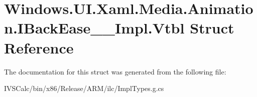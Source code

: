 \hypertarget{struct_windows_1_1_u_i_1_1_xaml_1_1_media_1_1_animation_1_1_i_back_ease_____impl_1_1_vtbl}{}\section{Windows.\+U\+I.\+Xaml.\+Media.\+Animation.\+I\+Back\+Ease\+\_\+\+\_\+\+Impl.\+Vtbl Struct Reference}
\label{struct_windows_1_1_u_i_1_1_xaml_1_1_media_1_1_animation_1_1_i_back_ease_____impl_1_1_vtbl}


The documentation for this struct was generated from the following file\+:\begin{DoxyCompactItemize}
\item 
I\+V\+S\+Calc/bin/x86/\+Release/\+A\+R\+M/ilc/Impl\+Types.\+g.\+cs\end{DoxyCompactItemize}
